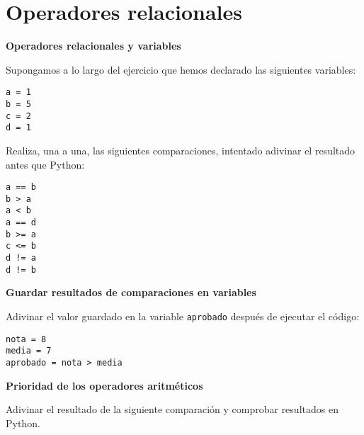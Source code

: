 \documentclass[a4paper, 11pt]{scrartcl}
\newenvironment{code}{\begin{tcolorbox}[colback=red!2!white]}{\end{tcolorbox}}
\begin{document}
\newpage

\section{Operadores relacionales}


\noindent\textbf{\sffamily Operadores relacionales y variables}



Supongamos a lo largo del ejercicio que hemos declarado las siguientes variables:

\smallskip

\begin{code}

\begin{verbatim}
a = 1
b = 5
c = 2
d = 1
\end{verbatim}

\end{code}





Realiza, una a una, las siguientes comparaciones, intentado adivinar el resultado antes que Python:

\smallskip

\begin{code}

\begin{verbatim}
a == b
b > a
a < b
a == d
b >= a
c <= b
d != a
d != b
\end{verbatim}

\end{code}






\noindent\textbf{\sffamily Guardar resultados de comparaciones en variables}

Adivinar el valor guardado en la variable \verb|aprobado| después de ejecutar el código:

\smallskip

\begin{code}

\begin{verbatim}
nota = 8
media = 7
aprobado = nota > media
\end{verbatim}

\end{code}


\noindent\textbf{\sffamily Prioridad de los operadores aritméticos}

Adivinar el resultado de la siguiente comparación y comprobar resultados en Python.
\end{document}
